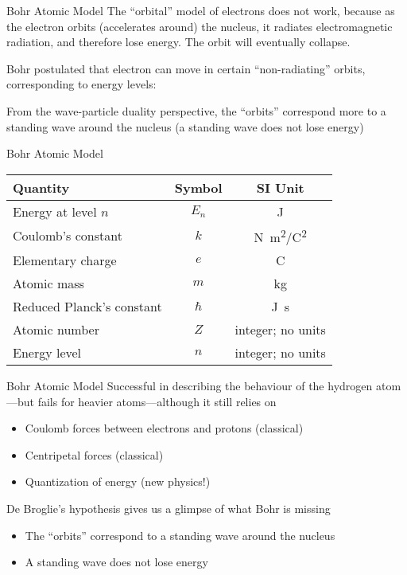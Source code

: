 \documentclass[12pt,compress,aspectratio=169]{beamer}
\newcommand{\eq}[2]{\vspace{#1}{\Large\begin{displaymath}#2\end{displaymath}}}
\begin{document}
\begin{frame}{Bohr Atomic  Model}
  The ``orbital'' model of electrons does not work, because as the electron
  orbits (accelerates around) the nucleus, it radiates electromagnetic
  radiation, and therefore lose energy. The orbit will eventually collapse.

  \vspace{.1in} Bohr postulated that electron can move in certain
  ``non-radiating'' orbits, corresponding to energy levels:

  \eq{-.1in}{
    \boxed{E_n=-\frac{k^2e^4m}{2\hbar^2}\frac{Z^2}{n^2}}
  }
  
  From the wave-particle duality perspective, the ``orbits'' correspond more to
  a standing wave around the nucleus (a standing wave does not lose energy)
\end{frame}


\begin{frame}{Bohr Atomic Model}
  \eq{-.1in}{
    \boxed{E_n=-\frac{k^2e^4m}{2\hbar^2}\frac{Z^2}{n^2}}
  }
  \begin{center}
    \begin{tabular}{l|c|c}
      \rowcolor{pink}
      \textbf{Quantity} & \textbf{Symbol} & \textbf{SI Unit} \\ \hline
      Energy at level $n$ & $E_n$ & \si{\joule} \\
      Coulomb's constant & $k$ & \si{N.m^2/C^2} \\
      Elementary charge  & $e$ & \si{\coulomb} \\
      Atomic mass        & $m$ & \si{\kilo\gram} \\
      Reduced Planck's constant & $\hbar$ & \si{\joule.\second}\\
      Atomic number      & $Z$ & integer; no units\\
      Energy level       & $n$ & integer; no units
    \end{tabular}
  \end{center}
\end{frame}


\begin{frame}{Bohr Atomic  Model}
  Successful in describing the behaviour of the hydrogen atom---but fails for
  heavier atoms---although it still relies on 
  \begin{itemize}
  \item Coulomb forces between electrons and protons (classical)
  \item Centripetal forces (classical)
  \item Quantization of energy (new physics!)
  \end{itemize}
  De Broglie's hypothesis gives us a glimpse of what Bohr is missing
  \begin{itemize}
  \item The ``orbits'' correspond to a standing wave around the nucleus
  \item A standing wave does not lose energy
  \end{itemize}
\end{frame}
\end{document}
